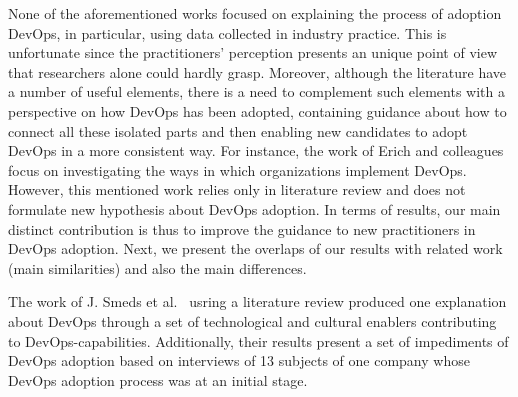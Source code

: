 

None of the aforementioned works focused on explaining the process of adoption DevOps,
in particular, using data collected in industry practice. This is unfortunate since the
practitioners' perception presents an unique point of view that researchers
alone could hardly grasp. Moreover, although the literature have a number of
useful elements, there is a need to complement such elements with a perspective on how DevOps has
been adopted, containing guidance about how to connect all these isolated parts
and then enabling new candidates to adopt DevOps in a more consistent way. 
For instance, the work of Erich and colleagues~\cite{qualitative_devops_journalsw_17}
focus on investigating the ways in which organizations implement DevOps. 
However, this mentioned work relies only in literature review and does not formulate
new hypothesis about DevOps adoption.
In terms of results, our main distinct contribution is thus to improve the guidance
to new practitioners in DevOps adoption. 
Next, we present the overlaps of our
results with related work (main similarities) and also the main differences.

The work of J. Smeds et al.~\cite{devops_a_definition_xp_15} usring a literature
review produced one explanation about DevOps through a set of technological and
cultural enablers contributing to DevOps-capabilities. Additionally, their results 
present a set of impediments of DevOps adoption based on interviews of 13
subjects of one company whose DevOps adoption process was at an initial stage.

